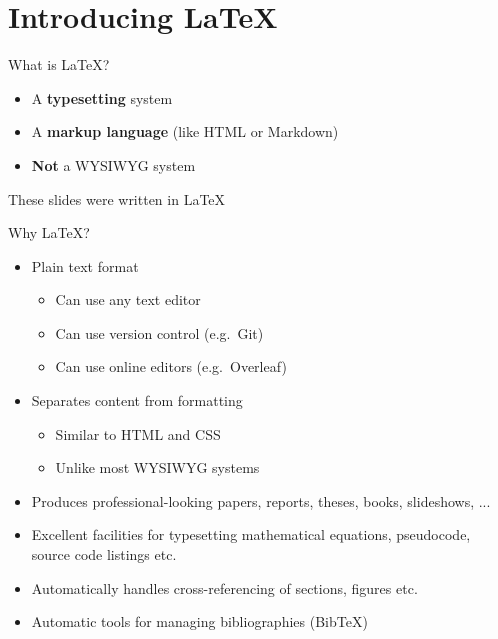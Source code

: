 
\part{Introducing LaTeX}
\frame{\partpage}

\begin{frame}{What is LaTeX?}
    \begin{itemize}
        \pause\item A \textbf{typesetting} system
        \pause\item A \textbf{markup language}
                (like HTML or Markdown)
        \pause\item \textbf{Not} a WYSIWYG system
    \end{itemize}
\end{frame}

\begin{frame}{These slides were written in LaTeX}
    
\end{frame}

\begin{frame}{Why LaTeX?}
\begin{itemize}
	\pause\item Plain text format
	\begin{itemize}
		\pause\item Can use any text editor
		\pause\item Can use version control (e.g.\ Git)
		\pause\item Can use online editors (e.g.\ Overleaf)
	\end{itemize}
	\pause\item Separates content from formatting
	\begin{itemize}
		\pause\item Similar to HTML and CSS
		\pause\item Unlike most WYSIWYG systems
	\end{itemize}
	\pause\item Produces professional-looking papers, reports, theses, books, slideshows, ...
	\pause\item Excellent facilities for typesetting mathematical equations, pseudocode, source code listings etc.
	\pause\item Automatically handles cross-referencing of sections, figures etc.
	\pause\item Automatic tools for managing bibliographies (BibTeX)
\end{itemize}
\end{frame}

